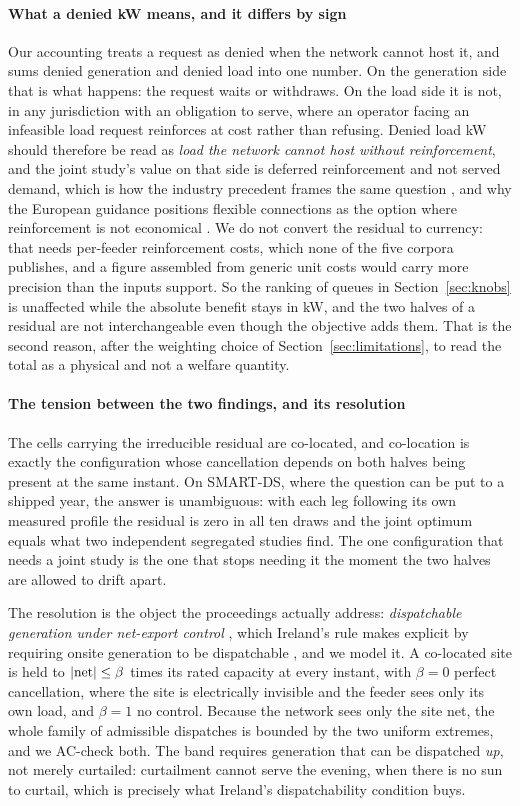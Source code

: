 \documentclass[review,authoryear,12pt]{elsarticle}
\begin{document}
\paragraph{What a denied kW means, and it differs by sign}
Our accounting treats a request as denied when the network cannot host it, and
sums denied generation and denied load into one number. On the generation side
that is what happens: the request waits or withdraws. On the load side it is not,
in any jurisdiction with an obligation to serve, where an operator facing an
infeasible load request reinforces at cost rather than refusing. Denied load kW
should therefore be read as \emph{load the network cannot host without
reinforcement}, and the joint study's value on that side is deferred
reinforcement and not served demand, which is how the industry precedent
frames the same question \citep{brattle2025}, and why the European guidance
positions flexible connections as the option where reinforcement is not
economical \citep{ec_gridconn2025}. We do not convert the residual to currency:
that needs per-feeder reinforcement costs, which none of the five corpora
publishes, and a figure assembled from generic unit costs would carry more
precision than the inputs support. So the ranking of queues in
Section~\ref{sec:knobs} is unaffected while the absolute benefit stays in kW,
and the two halves of a residual are not interchangeable even though the
objective adds them. That is the second reason, after the weighting choice of
Section~\ref{sec:limitations}, to read the total as a physical and not a
welfare quantity.

\paragraph{The tension between the two findings, and its resolution}
The cells carrying the irreducible residual are co-located, and co-location is
exactly the configuration whose cancellation depends on both halves being
present at the same instant. On SMART-DS, where the question can be put to a
shipped year, the answer is unambiguous: with each leg following its own
measured profile the residual is zero in all ten draws and the joint optimum
equals what two independent segregated studies find. The one configuration that
needs a joint study is the one that stops needing it the moment the two halves
are allowed to drift apart.

The resolution is the object the proceedings actually address: \emph{dispatchable
generation under net-export control} \citep{brattle2025}, which Ireland's rule
makes explicit by requiring onsite generation to be dispatchable
\citep{cru2025}, and we model it. A co-located site is held
to $|{\rm net}| \le \beta$ times its rated capacity at every instant, with
$\beta=0$ perfect cancellation, where the site is electrically invisible and the
feeder sees only its own load, and $\beta=1$ no control. Because the network
sees only the site net, the whole family of admissible dispatches is bounded by
the two uniform extremes, and we AC-check both. The band requires generation
that can be dispatched \emph{up}, not merely curtailed: curtailment cannot
serve the evening, when there is no sun to curtail, which is precisely what
Ireland's dispatchability condition buys.
\end{document}

